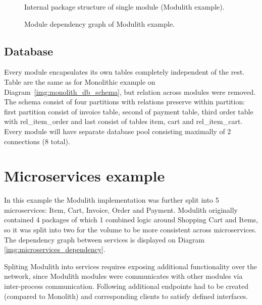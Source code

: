 \begin{figure}
    \centering
    
    \caption{Internal package structure of single module (Modulith example). \label{img:modulith_module_package}}
\end{figure}

\begin{figure}
    \centering
    
    \caption{Module dependency graph of Modulith example. \label{img:modulith_package}}
\end{figure}

\subsection{Database}
Every module encapsulates its own tables completely independent of the rest. Table are the same as for Monolithic example on Diagram~\ref{img:monolith_db_schema}, but relation across modules were removed. The schema consist of four partitions with relations preserve within partition: first partition consist of invoice table, second of payment table, third order table with rel\_item\_order and last consist of tables item, cart and rel\_item\_cart. Every module will have separate database pool consisting maximally of 2 connections (8 total).


\section{Microservices example}
In this example the Modulith implementation was further split into 5 microservices: Item, Cart, Invoice, Order and Payment. Modulith originally contained 4 packages of which 1 combined logic around Shopping Cart and Items, so it was split into two for the volume to be more consistent across microservices. The dependency graph between services is displayed on Diagram \ref{img:microservices_dependency}.

Spliting Modulith into services requires exposing additional functionality over the network, since Modulith modules were communicates with other modules via inter-process communication. Following additional endpoints had to be created (compared to Monolith) and corresponding clients to satisfy defined interfaces.

